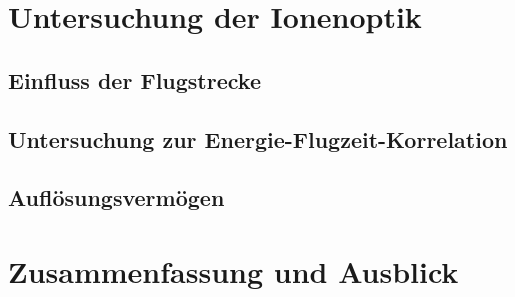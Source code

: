 \section{Untersuchung der Ionenoptik}

\subsection{Einfluss der Flugstrecke}
\subsection{Untersuchung zur Energie-Flugzeit-Korrelation}
\label{sec:delay}
\subsection{Auflösungsvermögen}

\section{Zusammenfassung und Ausblick}